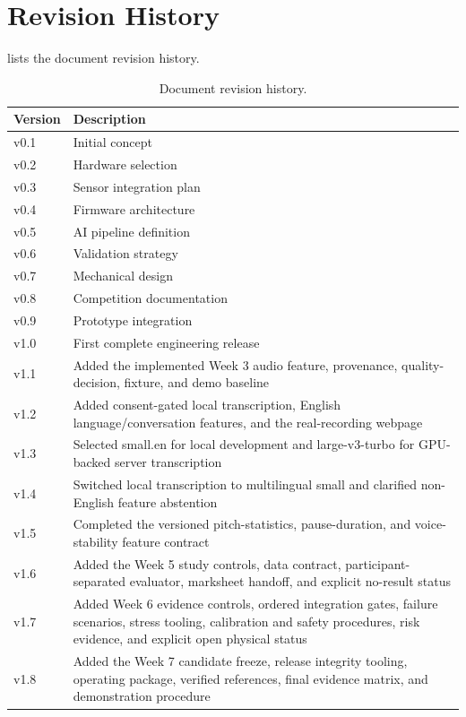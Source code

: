 \section{Revision History}
\label{sec:revision-history}

 lists the document revision history.

\begin{table}[H]
\centering
\caption{Document revision history.}
\label{tab:revision-history}
\scriptsize
\begin{tabularx}{\columnwidth}{@{}l Y@{}}
\toprule
\textbf{Version} & \textbf{Description} \\
\midrule
v0.1 & Initial concept \\
v0.2 & Hardware selection \\
v0.3 & Sensor integration plan \\
v0.4 & Firmware architecture \\
v0.5 & AI pipeline definition \\
v0.6 & Validation strategy \\
v0.7 & Mechanical design \\
v0.8 & Competition documentation \\
v0.9 & Prototype integration \\
v1.0 & First complete engineering release \\
v1.1 & Added the implemented Week 3 audio feature, provenance, quality-decision, fixture, and demo baseline \\
v1.2 & Added consent-gated local transcription, English language/conversation features, and the real-recording webpage \\
v1.3 & Selected small.en for local development and large-v3-turbo for GPU-backed server transcription \\
v1.4 & Switched local transcription to multilingual small and clarified non-English feature abstention \\
v1.5 & Completed the versioned pitch-statistics, pause-duration, and voice-stability feature contract \\
v1.6 & Added the Week 5 study controls, data contract, participant-separated evaluator, marksheet handoff, and explicit no-result status \\
v1.7 & Added Week 6 evidence controls, ordered integration gates, failure scenarios, stress tooling, calibration and safety procedures, risk evidence, and explicit open physical status \\
v1.8 & Added the Week 7 candidate freeze, release integrity tooling, operating package, verified references, final evidence matrix, and demonstration procedure \\
\bottomrule
\end{tabularx}
\end{table}

